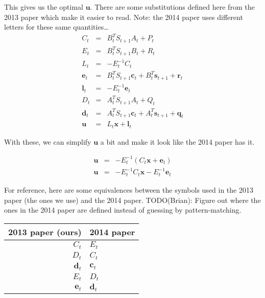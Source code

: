 \documentclass[a4paper,12pt]{article}
\begin{document}
This gives us the optimal $\boldsymbol{u}$.  There are some substitutions defined here from the 2013 paper which make it easier to read.
Note: the 2014 paper uses different letters for these same quantities\dots
\\
$$\begin{array}{rcl}
C_t &=& B^T_t S_{t + 1} A_t + P_t \\
E_t &=&  B_{t}^T S_{t + 1} B_{t} + R_t \\
L_t &=& - E_t ^{-1} C_t \\

\boldsymbol{e}_t &=& B_t^T S_{t + 1} \boldsymbol{c}_t + B_{t}^T \boldsymbol{s}_{t + 1} + \boldsymbol{r}_t \\
\boldsymbol{l}_t &=&  - E^{-1}_t \boldsymbol{e}_t \\

D_t &=& A_t^T S_{t + 1} A_t + Q_t \\
\boldsymbol{d}_t &=& A_t^T S_{t + 1} \boldsymbol{c}_t + A_{t}^T \boldsymbol{s}_{t + 1} + \boldsymbol{q}_t
\\
\boldsymbol{u} &=& L_t \boldsymbol{x} + \boldsymbol{l}_t
\end{array}$$

With these, we can simplify $\boldsymbol{u}$ a bit and make it look like the 2014 paper has it.

$$\begin{array}{rcl}
  \boldsymbol{u} &=& -E_t^{-1} \left( C_t \boldsymbol{x} + \boldsymbol{e}_t \right) \\
  \boldsymbol{u} &=& -E_t^{-1} C_t \boldsymbol{x} - E_t^{-1} \boldsymbol{e}_t
\end{array}$$

For reference, here are some equivalences between the symbols used in the 2013
paper (the ones we use) and the 2014 paper.
TODO(Brian): Figure out where the ones in the 2014 paper are defined instead of
guessing by pattern-matching.
\\ \begin{tabular}{ | r | l | }
  \hline
  2013 paper (ours) & 2014 paper \\
  \hline
  $C_t$ & $E_t$ \\
  $D_t$ & $C_t$ \\
  $\boldsymbol{d}_t$ & $\boldsymbol{c}_t$ \\
  $E_t$ & $D_t$ \\
  $\boldsymbol{e}_t$ & $\boldsymbol{d}_t$ \\
  \hline
\end{tabular} \\
\end{document}
